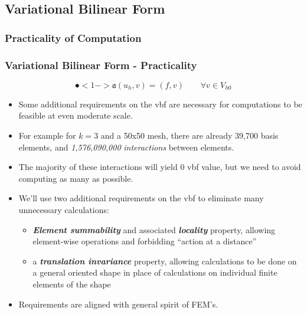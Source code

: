 \documentclass[compress]{beamer}
\begin{document}
\subsection{Variational Bilinear Form}

\subsubsection{Practicality of Computation}

\begin{frame}
  \frametitle{Variational Bilinear Form - Practicality}
  $$\spot<1->{\mathfrak{a}}(u_h,v) = (f,v)\quad\quad \forall{v} \in V_{h0}$$
  \begin{itemize}[<+->]
    \item Some additional requirements on the vbf are necessary for computations to be feasible at even moderate scale.
    \item For example for $k=3$ and a 50x50 mesh, there are already 39,700 basis elements, and \emph{1,576,090,000} 
      \emph{interactions} between elements. 
    \item The majority of these interactions will yield $0$ vbf value, but we need to avoid computing as many as possible.
    \item We'll use two additional requirements on the vbf to eliminate many unnecessary calculations:
        \begin{itemize}[<+->]
          \item \emph{\textbf{Element summability}} and associated \emph{\textbf{locality}} property, allowing element-wise operations and
            forbidding ``action at a distance''
          \item a \emph{\textbf{translation invariance}} property, allowing calculations to be done on a general oriented shape in place of
            calculations on individual finite elements of the shape
        \end{itemize}
    \item Requirements are aligned with general spirit of FEM's.
  \end{itemize}
\end{frame}
\end{document}
